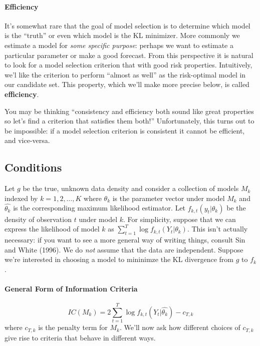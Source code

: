 \documentclass[12pt]{article}
\theoremstyle{definition}
\begin{document}
\paragraph{Efficiency} It's somewhat rare that the goal of model selection is to determine which model is the ``truth'' or even which model is the KL minimizer. More commonly we estimate a model for \emph{some specific purpose}: perhaps we want to estimate a particular parameter or make a good forecast. From this perspective it is natural to look for a model selection criterion that with good risk properties. Intuitively, we'l like the criterion to perform ``almost as well'' as the risk-optimal model in our candidate set. This property, which we'll make more precise below, is called \textbf{efficiency}. 

You may be thinking ``consistency and efficiency both sound like great properties so let's find a criterion that satisfies them both!'' Unfortunately, this turns out to be impossible: if a model selection criterion is consistent it cannot be efficient, and vice-versa. 




\subsection{Conditions}
Let $g$ be the true, unknown data density and consider a collection of models $M_k$ indexed by $k = 1, 2, \hdots, K$ where $\theta_k$ is the parameter vector under model $M_k$ and $\widehat{\theta_k}$ is the corresponding maximum likelihood estimator. Let $f_{k,t}(y_t|\theta_k)$ be the density of observation $t$ under model $k$. For simplicity, suppose that we can express the likelihood of model $k$ as $\sum_{t=1}^T \log f_{k,t}(Y_t| \theta_k)$. This isn't actually necessary: if you want to see a more general way of writing things, consult Sin and White (1996). We do \emph{not} assume that the data are independent. Suppose we're interested in choosing a model to mininimze the KL divergence from $g$ to $f_k$.




\paragraph{General Form of Information Criteria}
	$$IC(M_k) = 2 \sum_{t=1}^T \log f_{k,t}(Y_t| \widehat{\theta_k}) - c_{T,k}$$
where $c_{T,k}$ is the penalty term for $M_k$. We'll now ask how different choices of $c_{T,k}$ give rise to criteria that behave in different ways. 
\end{document}

